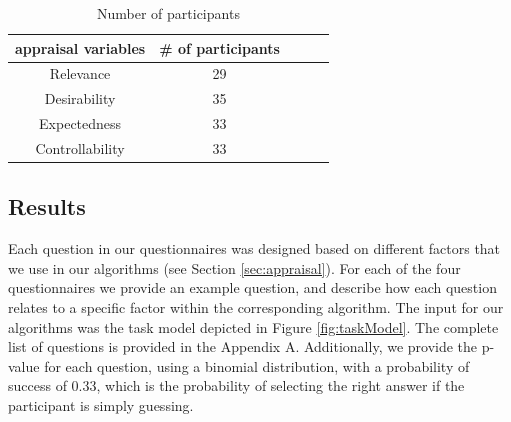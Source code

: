 \documentclass[12pt]{report}
\begin{document}
\begin{table}[t]
\centering
\caption{Number of participants}
\begin{tabular}{|c|c|c|c|c|} \hline
appraisal variables & \# of participants\\ \hline 
Relevance &  29\\ \hline
Desirability & 35\\ \hline 
Expectedness & 33\\ \hline 
Controllability & 33\\ \hline
\end{tabular}
\label{tbl:statistics}
\end{table}

% 

\subsection{Results}
\label{sec:results-crowdsourcing}
Each question in our questionnaires was designed based on different factors that
we use in our algorithms (see Section \ref{sec:appraisal}).  For each of the
four questionnaires we provide an example question, and describe how each
question relates to a specific factor within the corresponding algorithm. The
input for our algorithms was the task model depicted in Figure
\ref{fig:taskModel}. The complete list of questions is provided in the Appendix
A. Additionally, we provide the p-value for each question, using a binomial
distribution, with a probability of success of 0.33, which is the probability of
selecting the right answer if the participant is simply guessing.
\end{document}
